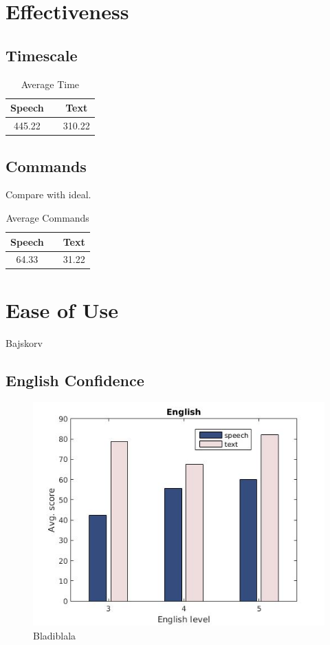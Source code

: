 \section{Effectiveness} 
\subsection{Timescale}

\begin{table}[h!]
  \centering
  \label{tab:table1}
  \begin{tabular}{ccc}
    \toprule
    Speech &   & Text\\
    \midrule
    445.22 &   & 310.22\\
    \bottomrule
  \end{tabular}
  \caption{Average Time}
\end{table}

\subsection{Commands}
Compare with ideal.

\begin{table}[h!]
  \centering
  \label{tab:table1}
  \begin{tabular}{ccc}
    \toprule
    Speech &   & Text\\
    \midrule
    64.33 &   & 31.22\\
    \bottomrule
  \end{tabular}
  \caption{Average Commands}
\end{table}

\section{Ease of Use}
Bajskorv

\subsection{English Confidence}

\begin{figure}[p]
  \includegraphics{images/english.jpg}
  \caption{Bladiblala}
\end{figure}

